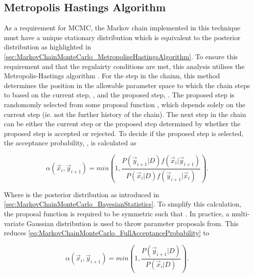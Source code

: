 \subsection{Metropolis Hastings Algorithm}
\label{sec:MarkovChainMonteCarlo_MetropoliseHastingsAlgorithm}

As a requirement for MCMC, the Markov chain implemented in this technique must have a unique stationary distribution which is equivalent to the posterior distribution as highlighted in \autoref{sec:MarkovChainMonteCarlo_MetropoliseHastingsAlgorithm}. To ensure this requirement and that the regulairty conditions are met, this analysis utilises the Metropolis-Hastings algorithm . For the  step in the chainn, this method determines the position in the allowable parameter space to which the chain steps to based on the current step, , and the proposed step, . The proposed step is randomomly selected from some proposal function , which depends solely on the current step (ie. not the further history of the chain). The next step in the chain  can be either the current step or the proposed step determined by whether the proposed step is accepted or rejected. To decide if the proposed step is selected, the acceptance probability, , is calculated as

\begin{equation}
  \label{eq:MarkovChainMonteCarlo_FullAcceptanceProbability}
  \alpha(\vec{x}_{i},\vec{y}_{i+1}) = min\left(1,\frac{P(\vec{y}_{i+1}|D)f(\vec{x}_{i}|\vec{y}_{i+1})}{P(\vec{x}_{i}|D)f(\vec{y}_{i+1}|\vec{x}_{i})} \right).
\end{equation}

Where  is the posterior distribution as introduced in \autoref{sec:MarkovChainMonteCarlo_BayesianStatistics}. To simplify this calculation, the proposal function is required to be symmetric such that . In practice, a multi-variate Gaussian distribution is used to throw parameter proposals from. This reduces \autoref{eq:MarkovChainMonteCarlo_FullAcceptanceProbability} to

\begin{equation}
  \label{eq:MarkovChainMonteCarlo_ReducedAcceptanceProbability}
  \alpha(\vec{x}_{i},\vec{y}_{i+1}) = min\left(1,\frac{P(\vec{y}_{i+1}|D)}{P(\vec{x}_{i}|D)} \right).
\end{equation}

